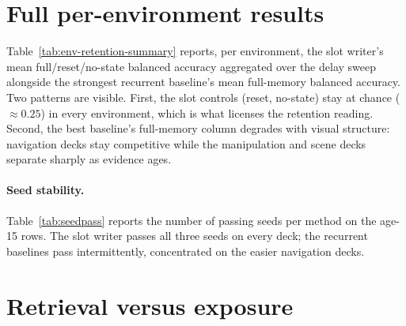 \section{Full per-environment results}
\label{app:full}

Table~\ref{tab:env-retention-summary} reports, per environment, the slot
writer's mean full/reset/no-state balanced accuracy aggregated over the delay
sweep alongside the strongest recurrent baseline's mean full-memory balanced
accuracy.  Two patterns are visible.  First, the slot controls (reset, no-state)
stay at chance ($\approx0.25$) in every environment, which is what licenses the
retention reading.  Second, the best baseline's full-memory column degrades with
visual structure: navigation decks stay competitive while the manipulation and
scene decks separate sharply as evidence ages.

\begin{table}[h]
\centering
\footnotesize
\caption{Per-environment retention summary (no per-age columns).  Slot columns
are mean full/reset/no-state balanced accuracy over the dense mixed-age delay
sweep (protocol~P1); the ``Best baseline'' column is the strongest recurrent
baseline's mean full-memory balanced accuracy over its evaluated delays
(protocol~P0, \protect{}), with the winning
baseline in parentheses.}
\label{tab:env-retention-summary}

\end{table}

\paragraph{Seed stability.}
Table~\ref{tab:seedpass} reports the number of passing seeds per method on the
age-15 rows.  The slot writer passes all three seeds on every deck; the recurrent
baselines pass intermittently, concentrated on the easier navigation decks.

\begin{table}[h]
\centering
\footnotesize
\caption{Passing seeds (out of 3) per method on age-15 rows.}
\label{tab:seedpass}

\end{table}

\section{Retrieval versus exposure}
\label{app:retrieval}

